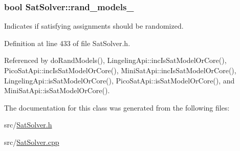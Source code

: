 \hypertarget{classSatSolver_a73fed24d8fb4da85ef82dc53ac5f28c7}{
\subsubsection[{rand\-\_\-models\-\_\-}]{\setlength{\rightskip}{0pt plus 5cm}bool Sat\-Solver\-::rand\-\_\-models\-\_\-\hspace{0.3cm}{\ttfamily [protected]}}}\label{classSatSolver_a73fed24d8fb4da85ef82dc53ac5f28c7}


Indicates if satisfying assignments should be randomized. 



Definition at line 433 of file Sat\-Solver.\-h.



Referenced by do\-Rand\-Models(), Lingeling\-Api\-::inc\-Is\-Sat\-Model\-Or\-Core(), Pico\-Sat\-Api\-::inc\-Is\-Sat\-Model\-Or\-Core(), Mini\-Sat\-Api\-::inc\-Is\-Sat\-Model\-Or\-Core(), Lingeling\-Api\-::is\-Sat\-Model\-Or\-Core(), Pico\-Sat\-Api\-::is\-Sat\-Model\-Or\-Core(), and Mini\-Sat\-Api\-::is\-Sat\-Model\-Or\-Core().



The documentation for this class was generated from the following files\-:\begin{DoxyCompactItemize}
\item 
src/\hyperlink{SatSolver_8h}{Sat\-Solver.\-h}\item 
src/\hyperlink{SatSolver_8cpp}{Sat\-Solver.\-cpp}\end{DoxyCompactItemize}

